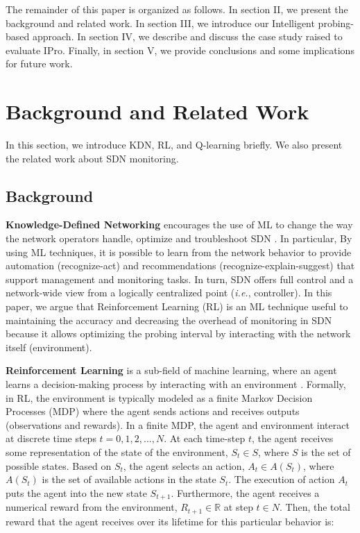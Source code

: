 The remainder of this paper is organized as follows. In section II, we present the background and related work. In section III, we introduce our Intelligent probing-based approach. In section IV, we describe and discuss the case study raised to evaluate IPro. Finally, in section V, we provide conclusions and some implications for future work. 

\section{Background and Related Work}
\label{sec:background_related_work} 
In this section, we introduce KDN, RL, and Q-learning briefly. We also present the related work about SDN monitoring.

\subsection{Background}
\label{subsec:background}

\textbf{Knowledge-Defined Networking} encourages the use of ML to change the way the network operators handle, optimize and troubleshoot SDN \cite{mestres_2017:KDN}. In particular, By using ML techniques, it is possible to learn from the network behavior to provide automation (recognize-act) and recommendations (recognize-explain-suggest) that support management and monitoring tasks. In turn, SDN offers full control and a network-wide view from a logically centralized point (\textit{i.e.}, controller). In this paper, we argue that Reinforcement Learning (RL) is an ML technique useful to maintaining the accuracy and decreasing the overhead of monitoring in SDN because it allows optimizing the probing interval by interacting with the network itself (environment).

\textbf{Reinforcement Learning} is a sub-field of machine learning, where an agent learns a decision-making process by interacting with an environment \cite{sutton_1998:rl}. Formally, in RL, the environment is typically modeled as a finite Markov Decision Processes (MDP) \cite{kolobov2012:markov} where the agent sends actions and receives outputs (observations and rewards). In a finite MDP, the agent and environment interact at discrete time steps $t = 0, 1, 2,..., N$. At each time-step $t$, the agent receives some representation of the state of the environment, ${S}_t \in S $, where $S$ is the set of possible states. Based on ${S}_t $, the agent selects an action, ${A}_t \in A(S_t) $, where $ A(S_t) $ is the set of available actions in the state ${S}_t $. The execution of action $A_{t}$ puts the agent into the new state $S_{t+1}$. Furthermore, the agent receives a numerical reward from the environment, $R_{t+1} \in  \mathbb{R}$ at step $t \in N$. Then, the total reward that the agent receives over its lifetime for this particular behavior is:

